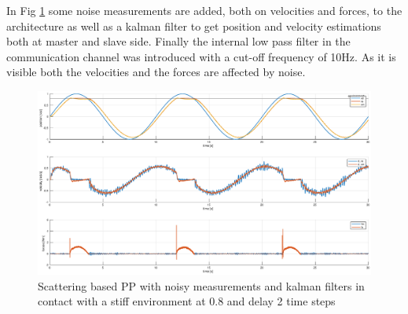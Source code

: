 \documentclass[a4paper,12pt]{article}
\begin{document}
In Fig \ref{fig:scat_pp_contact_kalman} some noise measurements are added, both on velocities and forces, to the architecture as well as a kalman filter to get position and velocity estimations both at master and slave side. Finally the internal low pass filter in the communication channel was introduced with a cut-off frequency of 10Hz. As it is visible both the velocities and the forces are affected by noise.

\begin{figure}[H]
    \begin{center}
        \hspace*{-4.5cm}
        \includegraphics[scale=0.5]{images/scat_pp_contact_kalman.eps}
    \end{center}
    \caption{Scattering based PP with noisy measurements and kalman filters in contact with a stiff environment at 0.8 and delay 2 time steps}
    \label{fig:scat_pp_contact_kalman}
\end{figure}
\end{document}
